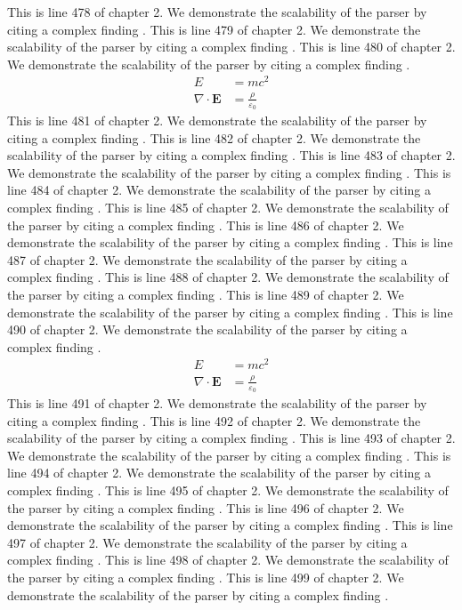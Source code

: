 This is line 478 of chapter 2. We demonstrate the scalability of the parser by citing a complex finding \cite{ref2_478}.
This is line 479 of chapter 2. We demonstrate the scalability of the parser by citing a complex finding \cite{ref2_479}.
This is line 480 of chapter 2. We demonstrate the scalability of the parser by citing a complex finding \cite{ref2_480}.
\begin{align*}
  E &= mc^2 \\
  \nabla \cdot \mathbf{E} &= \frac{\rho}{\varepsilon_0}
\end{align*}
This is line 481 of chapter 2. We demonstrate the scalability of the parser by citing a complex finding \cite{ref2_481}.
This is line 482 of chapter 2. We demonstrate the scalability of the parser by citing a complex finding \cite{ref2_482}.
This is line 483 of chapter 2. We demonstrate the scalability of the parser by citing a complex finding \cite{ref2_483}.
This is line 484 of chapter 2. We demonstrate the scalability of the parser by citing a complex finding \cite{ref2_484}.
This is line 485 of chapter 2. We demonstrate the scalability of the parser by citing a complex finding \cite{ref2_485}.
This is line 486 of chapter 2. We demonstrate the scalability of the parser by citing a complex finding \cite{ref2_486}.
This is line 487 of chapter 2. We demonstrate the scalability of the parser by citing a complex finding \cite{ref2_487}.
This is line 488 of chapter 2. We demonstrate the scalability of the parser by citing a complex finding \cite{ref2_488}.
This is line 489 of chapter 2. We demonstrate the scalability of the parser by citing a complex finding \cite{ref2_489}.
This is line 490 of chapter 2. We demonstrate the scalability of the parser by citing a complex finding \cite{ref2_490}.
\begin{align*}
  E &= mc^2 \\
  \nabla \cdot \mathbf{E} &= \frac{\rho}{\varepsilon_0}
\end{align*}
This is line 491 of chapter 2. We demonstrate the scalability of the parser by citing a complex finding \cite{ref2_491}.
This is line 492 of chapter 2. We demonstrate the scalability of the parser by citing a complex finding \cite{ref2_492}.
This is line 493 of chapter 2. We demonstrate the scalability of the parser by citing a complex finding \cite{ref2_493}.
This is line 494 of chapter 2. We demonstrate the scalability of the parser by citing a complex finding \cite{ref2_494}.
This is line 495 of chapter 2. We demonstrate the scalability of the parser by citing a complex finding \cite{ref2_495}.
This is line 496 of chapter 2. We demonstrate the scalability of the parser by citing a complex finding \cite{ref2_496}.
This is line 497 of chapter 2. We demonstrate the scalability of the parser by citing a complex finding \cite{ref2_497}.
This is line 498 of chapter 2. We demonstrate the scalability of the parser by citing a complex finding \cite{ref2_498}.
This is line 499 of chapter 2. We demonstrate the scalability of the parser by citing a complex finding \cite{ref2_499}.


